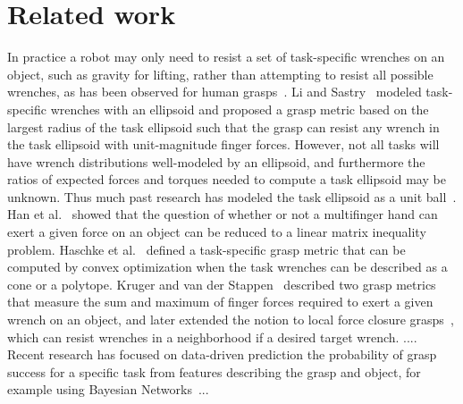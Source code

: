 \section{Related work}

In practice a robot may only need to resist a set of task-specific wrenches on an object, such as gravity for lifting, rather than attempting to resist all possible wrenches, as has been observed for human grasps~\cite{cutkosky1985grasping, feix2016grasp}.
Li and Sastry~\cite{li1988task} modeled task-specific wrenches with an ellipsoid and proposed a grasp metric based on the largest radius of the task ellipsoid such that the grasp can resist any wrench in the task ellipsoid with unit-magnitude finger forces.
However, not all tasks will have wrench distributions well-modeled by an ellipsoid, and furthermore the ratios of expected forces and torques needed to compute a task ellipsoid may be unknown.
Thus much past research has modeled the task ellipsoid as a unit ball~\cite{ferrari1992, pokorny2013classical}.
Han et al.~\cite{han2000grasp} showed that the question of whether or not a multifinger hand can exert a given force on an object can be reduced to a linear matrix inequality problem. 
Haschke et al.~\cite{haschke2005task} defined a task-specific grasp metric that can be computed by convex optimization when the task wrenches can be described as a cone or a polytope.
Kruger and van der Stappen~\cite{kruger2011partial} described two grasp metrics that measure the sum and maximum of finger forces required to exert a given wrench on an object, and later extended the notion to local force closure grasps~\cite{kruger2012local}, which can resist wrenches in a neighborhood if a desired target wrench.
....
Recent research has focused on data-driven prediction the probability of grasp success for a specific task from features describing the grasp and object, for example using Bayesian Networks~\cite{bekiroglu2013probabilistic}...


